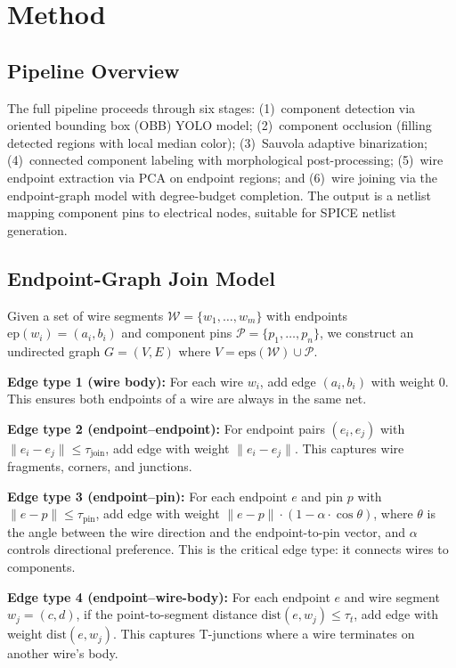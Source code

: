 \documentclass[conference]{IEEEtran}
\begin{document}
\section{Method}

\subsection{Pipeline Overview}

The full pipeline proceeds through six stages: (1)~component detection via oriented bounding box (OBB) YOLO model; (2)~component occlusion (filling detected regions with local median color); (3)~Sauvola adaptive binarization; (4)~connected component labeling with morphological post-processing; (5)~wire endpoint extraction via PCA on endpoint regions; and (6)~wire joining via the endpoint-graph model with degree-budget completion. The output is a netlist mapping component pins to electrical nodes, suitable for SPICE netlist generation.

\subsection{Endpoint-Graph Join Model}

Given a set of wire segments $\mathcal{W} = \{w_1, \ldots, w_m\}$ with endpoints $\text{ep}(w_i) = (a_i, b_i)$ and component pins $\mathcal{P} = \{p_1, \ldots, p_n\}$, we construct an undirected graph $G = (V, E)$ where $V = \text{eps}(\mathcal{W}) \cup \mathcal{P}$.

\textbf{Edge type 1 (wire body):} For each wire $w_i$, add edge $(a_i, b_i)$ with weight 0. This ensures both endpoints of a wire are always in the same net.

\textbf{Edge type 2 (endpoint--endpoint):} For endpoint pairs $(e_i, e_j)$ with $\|e_i - e_j\| \leq \tau_{\text{join}}$, add edge with weight $\|e_i - e_j\|$. This captures wire fragments, corners, and junctions.

\textbf{Edge type 3 (endpoint--pin):} For each endpoint $e$ and pin $p$ with $\|e - p\| \leq \tau_{\text{pin}}$, add edge with weight $\|e - p\| \cdot (1 - \alpha \cdot \cos\theta)$, where $\theta$ is the angle between the wire direction and the endpoint-to-pin vector, and $\alpha$ controls directional preference. This is the critical edge type: it connects wires to components.

\textbf{Edge type 4 (endpoint--wire-body):} For each endpoint $e$ and wire segment $w_j = (c, d)$, if the point-to-segment distance $\text{dist}(e, w_j) \leq \tau_t$, add edge with weight $\text{dist}(e, w_j)$. This captures T-junctions where a wire terminates on another wire's body.
\end{document}

